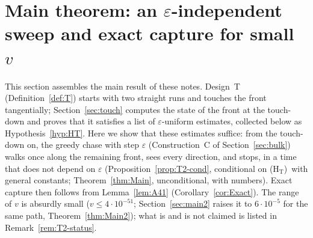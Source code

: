
\newcommand{\Mtd}{t_{\mathrm{td}}}
\newcommand{\Mtw}{t_{\mathrm w}}
\newcommand{\Mn}{\hat n}
\newcommand{\MG}{\mathcal G}
\newcommand{\MjI}{j_{\mathrm I}}
\newcommand{\MtI}{t_{\mathrm I}}
\newcommand{\MUA}{U_{\mathsf A}}
\newcommand{\MbA}{b_{\mathsf A}}
\newcommand{\MHT}{\textup{(H$_{\mathrm T}$)}}
\newcommand{\MaI}{a_{\mathrm I}}
\newcommand{\MCI}{C_{\mathrm I}}
\newcommand{\MLI}{\Lambda_{\mathrm I}}
\newcommand{\McI}{c_{\mathrm I}}
\newcommand{\MlI}{\lambda^{\mathrm I}}

\section{Main theorem: an $\varepsilon$-independent sweep and exact capture for small $v$}\label{sec:main}

This section assembles the main result of these notes. Design~T (Definition~\ref{def:T}) starts with two straight runs and
touches the front tangentially; Section~\ref{sec:touch} computes the state of the front at the touch-down and proves that it
satisfies a list of $\varepsilon$-uniform estimates, collected below as Hypothesis~\ref{hyp:HT}. Here we show that these estimates
suffice: from the touch-down on, the greedy chase with step $\varepsilon$ (Construction~C of Section~\ref{sec:bulk}) walks once along
the remaining front, sees every direction, and stops, in a time that does not depend on $\varepsilon$
(Proposition~\ref{prop:T2-cond}, conditional on \MHT\ with general constants; Theorem~\ref{thm:Main}, unconditional, with numbers).
Exact capture then follows from Lemma~\ref{lem:A41} (Corollary~\ref{cor:Exact}). The range of $v$ is absurdly small
($v\le4\cdot10^{-51}$; Section~\ref{sec:main2} raises it to $6\cdot10^{-5}$ for the same path, Theorem~\ref{thm:Main2}); what is and is not claimed is listed in Remark~\ref{rem:T2-status}.

